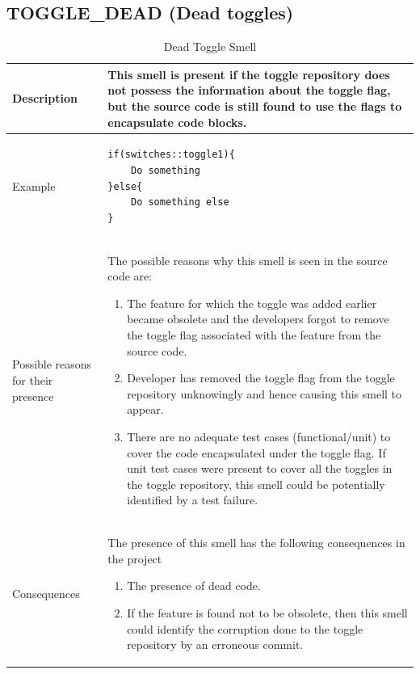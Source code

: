 \documentclass[conference]{IEEEtran}
\begin{document}
\subsection{TOGGLE\_DEAD (Dead toggles)}

\begin{table}[!h]
\caption{Dead Toggle Smell}
\centering
\begin{tabular}{|p{1.5cm}|p{7cm}|}
 \hline\hline
 Description & This smell is present if the toggle repository does not possess the information about the toggle flag, but the source code is still found to use the flags to encapsulate code blocks. \\ \hline
 Example & 
 \begin{lstlisting}
if(switches::toggle1){
    Do something
}else{
    Do something else
}
 \end{lstlisting}
  \\ \hline

 Possible reasons for their presence & The possible reasons why this smell is seen in the source code are:
 \begin{enumerate}
 \item{The feature for which the toggle was added earlier became obsolete and the developers forgot to remove the toggle flag associated with the feature from the source code.}
 \item{Developer has removed the toggle flag from the toggle repository unknowingly and hence causing this smell to appear.}
 \item{There are no adequate test cases (functional/unit) to cover the code encapsulated under the toggle flag. If unit test cases were present to cover all the toggles in the toggle repository, this smell could be potentially identified by a test failure.}
 \end{enumerate}
 \\ \hline
 
 Consequences & The presence of this smell has the following consequences in the project
 \begin{enumerate}
 \item{The presence of dead code.}
 \item{If the feature is found not to be obsolete, then this smell could identify the corruption done to the toggle repository by an erroneous commit.}
 \end{enumerate}
 \\ \hline
 

 

\end{tabular}
\label{table:toggle-dead}
\end{table}
\end{document}

